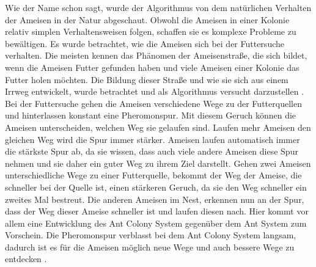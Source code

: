 Wie der Name schon sagt, wurde der Algorithmus von dem natürlichen Verhalten der Ameisen in der Natur abgeschaut. Obwohl die Ameisen in einer Kolonie relativ simplen Verhaltensweisen folgen, schaffen sie es komplexe Probleme zu bewältigen. Es wurde betrachtet, wie die Ameisen sich bei der Futtersuche verhalten. Die meisten kennen das Phänomen der Ameisenstraße, die sich bildet, wenn die Ameisen Futter gefunden haben und viele Ameisen einer Kolonie das Futter holen möchten. Die Bildung dieser Straße und wie sie sich aus einem Irrweg entwickelt, wurde betrachtet und als Algorithmus versucht darzustellen \citep[S.1-4]{Blum2003}.
\newline
\newline
Bei der Futtersuche gehen die Ameisen verschiedene Wege zu der Futterquellen und hinterlassen konstant eine Pheromonspur. Mit diesem Geruch können die Ameisen unterscheiden, welchen Weg sie gelaufen sind. Laufen mehr Ameisen den gleichen Weg wird die Spur immer stärker. Ameisen laufen automatisch immer die stärkste Spur ab, da sie wissen, dass auch viele andere Ameisen diese Spur nehmen und sie daher ein guter Weg zu ihrem Ziel darstellt. Gehen zwei Ameisen unterschiedliche Wege zu einer Futterquelle, bekommt der Weg der Ameise, die schneller bei der Quelle ist, einen stärkeren Geruch, da sie den Weg schneller ein zweites Mal bestreut. Die anderen Ameisen im Nest, erkennen nun an der Spur, dass der Weg dieser Ameise schneller ist und laufen diesen nach. Hier kommt vor allem eine Entwicklung des Ant Colony System gegenüber dem Ant System zum Vorschein. Die Pheromonspur verblasst bei dem Ant Colony System langsam, dadurch ist es für die Ameisen möglich neue Wege und auch bessere Wege zu entdecken \citep[S.33-35]{OKWU.2021}.
\newline